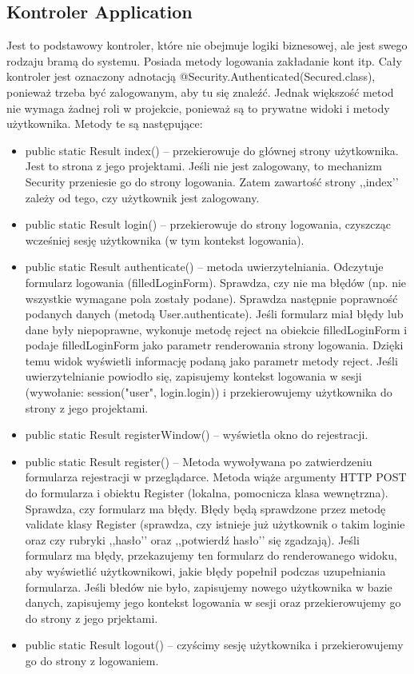 \documentclass[a4paper,12pt,notitlepage]{mwrep}
\begin{document}
\subsection{Kontroler Application}
Jest to podstawowy kontroler, które nie obejmuje logiki biznesowej, ale jest swego rodzaju bramą
do systemu. Posiada metody logowania zakładanie kont itp. Cały kontroler jest oznaczony
adnotacją @Security.Authenticated(Secured.class), ponieważ trzeba być zalogowanym,
aby tu się znaleźć. Jednak większość metod nie wymaga żadnej roli w projekcie,
ponieważ są to prywatne widoki i metody użytkownika. Metody te są następujące:
\begin{itemize}
    \item    public static Result index() -- przekierowuje do głównej strony użytkownika.
        Jest to strona z jego projektami. Jeśli nie jest zalogowany, to mechanizm
        Security przeniesie go do strony logowania. Zatem zawartość strony
        ,,index’’ zależy od tego, czy użytkownik jest zalogowany.
    \item    public static Result login() -- przekierowuje do strony logowania, czyszcząc
        wcześniej sesję użytkownika (w tym kontekst logowania).
    \item    public static Result authenticate() -- metoda uwierzytelniania. Odczytuje
        formularz logowania (filledLoginForm). Sprawdza, czy nie ma błędów
        (np. nie wszystkie wymagane pola zostały podane). Sprawdza następnie
        poprawność podanych danych (metodą User.authenticate). Jeśli formularz
        miał błędy lub dane były niepoprawne, wykonuje metodę reject na obiekcie
        filledLoginForm i podaje filledLoginForm jako parametr renderowania strony
        logowania. Dzięki temu widok wyświetli informację podaną jako parametr
        metody reject. Jeśli uwierzytelnianie powiodło się, zapisujemy kontekst
        logowania w sesji (wywołanie: session("user", login.login)) i przekierowujemy
        użytkownika do strony z jego projektami.
    \item    public static Result registerWindow() -- wyświetla okno do rejestracji.
    \item    public static Result register() -- Metoda wywoływana po zatwierdzeniu formularza
        rejestracji w przeglądarce. Metoda wiąże argumenty HTTP POST do formularza
        i obiektu Register (lokalna, pomocnicza klasa wewnętrzna). Sprawdza, czy
        formularz ma błędy. Błędy będą sprawdzone przez metodę validate klasy
        Register (sprawdza, czy istnieje już użytkownik o takim loginie oraz czy
        rubryki ,,hasło’’ oraz ,,potwierdź hasło’’ się zgadzają). Jeśli formularz
        ma błędy, przekazujemy ten formularz do renderowanego widoku, aby
        wyświetlić użytkownikowi, jakie błędy popełnił podczas uzupełniania formularza.
        Jeśli błedów nie było, zapisujemy nowego użytkownika w bazie danych,
        zapisujemy jego kontekst logowania w sesji oraz przekierowujemy go do
        strony z jego prjektami.
    \item    public static Result logout() -- czyścimy sesję użytkownika i przekierowujemy
        go do strony z logowaniem.
\end{itemize}
\end{document}

